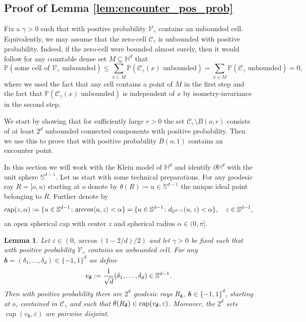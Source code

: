 \documentclass[12pt,a4paper]{article}
\newtheorem{lemma}[proposition]{Lemma}
\theoremstyle{definition}
\renewcommand{\H}{\mathbb{H}}
\renewcommand{\P}{\mathbb{P}}
\DeclareMathOperator{\capop}{cap}
\begin{document}
\subsection{Proof of Lemma \ref{lem:encounter_pos_prob}} \label{sec:ExistenceEncounter}

Fix a \(\gamma > 0\) such that with positive probability \(\mathcal{V}_\gamma\) contains an unbounded cell. Equivalently, we may assume that the zero-cell \(\mathcal C_\gamma\) is unbounded with positive probability.
Indeed, if the zero-cell were bounded almost surely, then it would follow for any countable dense set $M\subseteq \H^d$ that 
\[ \P(\text{some cell of $\mathcal{V}_\gamma$ unbounded}) \leq \sum_{x \in M} \P(\mathcal{C}_\gamma(x)\text{ unbounded}) = \sum_{x \in M} \P(\mathcal{C}_\gamma\text{ unbounded}) = 0, \]
where we used the fact that any cell contains a point of $M$ in the first step and the fact that $\P(\mathcal C_\gamma(x) \text{ unbounded})$ is independent of $x$ by isometry-invariance in the second step. 

We start by showing that for sufficiently large $r>0$ the set \(\mathcal C_\gamma \setminus B(o,r)\) consists of at least \(2^d\) unbounded connected components with positive probability. Then we use this to prove that with positive probability \(B(o,1)\) contains an encounter point.

In this section we will work with the Klein model of $\H^d$ and identify $\partial\H^d$ with the unit sphere $\mathbb{S}^{d-1}$. Let us start with some technical preparations. For any geodesic ray $R = [o,u)$ starting at $o$ denote by $\theta(R) \coloneqq u \in\mathbb{S}^{d-1}$ the unique ideal point belonging to $R$. Further denote by 
\[
\capop(z,\alpha) :=\{u\in\mathbb{S}^{d-1}\colon {\rm arccos}\langle u,z\rangle <\alpha\}
 =  \{u\in\mathbb{S}^{d-1}\colon d_{\mathbb{S}^{d-1}}(u,z) <\alpha\}, \quad z\in\mathbb{S}^{d-1},
\]
an open spherical cap with center $z$ and spherical radius $\alpha\in (0,\pi]$. 


\begin{lemma}\label{lm:inf_rays}
    Let $\varepsilon \in (0,\arccos(1-2/d)/2)$ and let $\gamma > 0$ be fixed such that with positive probability \(\mathcal{V}_\gamma\) contains an unbounded cell. For any $\boldsymbol\delta = (\delta_1,\ldots,\delta_d)\in\{-1,1\}^d$ we define
    \begin{equation}\label{eq:cap_centers}
    v_{\boldsymbol\delta}:={1\over \sqrt{d}}(\delta_1,\ldots,\delta_d)\in \mathbb{S}^{d-1}.
    \end{equation}
    Then with positive probability there are $2^d$ geodesic rays $R_{\boldsymbol\delta}$, $\boldsymbol\delta\in\{-1,1\}^d$, starting at $o$, contained in $\mathcal C_\gamma$ and such that $\theta(R_{\boldsymbol\delta})\in {\rm cap}(v_{\boldsymbol\delta},\varepsilon)$.
    Moreover, the $2^d$ sets $\capop(v_{\boldsymbol\delta},\varepsilon)$ are pairwise disjoint.
\end{lemma}
\end{document}

